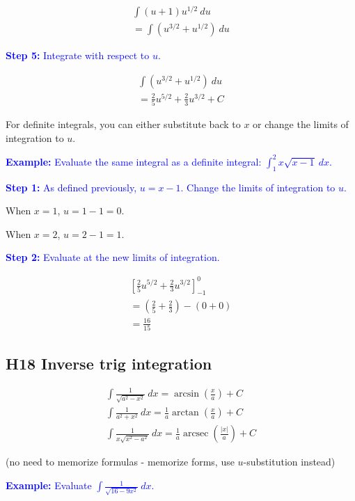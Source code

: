\documentclass[letterpaper, 12pt]{article}
\DeclareMathOperator{\arcsec}{arcsec}
\newcommand{\example}[1]{\textcolor{blue}{\textbf{Example:} #1}}
\newcommand{\step}[2]{\textcolor{blue}{\textbf{Step #1:} #2}}
\begin{document}
\begin{gather*}
\int (u+1) u^{1/2} \: du \\
= \int (u^{3/2} + u^{1/2}) \: du
\end{gather*}

\step{5}{Integrate with respect to $u$.}

\begin{gather*}
\int (u^{3/2} + u^{1/2}) \: du \\
= \boxed{\frac{2}{5} u^{5/2} + \frac{2}{3} u^{3/2} + C}
\end{gather*}

For definite integrals, you can either substitute back to $x$ or change the limits of integration to $u$.

\example{Evaluate the same integral as a definite integral: $\displaystyle \int_1^2 x\sqrt{x-1} \: dx$.}

\step{1}{As defined previously, $u = x - 1$. Change the limits of integration to $u$.}

When $x = 1$, $u = 1 - 1 = 0$.

When $x = 2$, $u = 2 - 1 = 1$.

\step{2}{Evaluate at the new limits of integration.}

\begin{gather*}
\left[ \frac{2}{5} u^{5/2} + \frac{2}{3} u^{3/2} \right]_{-1}^{0} \\
= \left(\frac{2}{5}+\frac{2}{3}\right) - (0+0) \\
= \boxed{\frac{16}{15}}
\end{gather*}

\subsection*{H18 Inverse trig integration}

\begin{gather*}
\int \frac{1}{\sqrt{a^2 - x^2}} \: dx = \arcsin \left( \frac{x}{a} \right) + C \\
\int \frac{1}{a^2 + x^2} \: dx = \frac{1}{a} \arctan \left( \frac{x}{a} \right) + C \\
\int \frac{1}{x \sqrt{x^2 - a^2}} \: dx = \frac{1}{a} \arcsec \left( \frac{|x|}{a} \right) + C
\end{gather*}

(no need to memorize formulas - memorize forms, use $u$-substitution instead)

\example{Evaluate $\displaystyle \int \frac{1}{\sqrt{16 - 9x^2}} \: dx$.}
\end{document}
